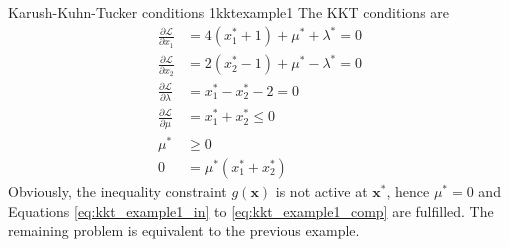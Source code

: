 \begin{example}{Karush-Kuhn-Tucker conditions 1}{kktexample1}
    The KKT conditions are 
    \begin{align}
        \frac{\partial \mathcal{L}}{\partial x_1} &= 4 (x_1^* + 1) + \mu^* + \lambda^*  = 0\\
        \frac{\partial \mathcal{L}}{\partial x_2} &= 2 (x_2^* - 1) + \mu^* - \lambda^*  = 0\\
        \frac{\partial \mathcal{L}}{\partial \lambda} &= x_1^* - x_2^* - 2 = 0 \\
        \label{eq:kkt_example1_in}
        \frac{\partial \mathcal{L}}{\partial \mu} &= x_1^*+x_2^* \le 0 \\
        \mu^* &\ge 0 \\
        0 &= \mu^*(x_1^*+x_2^*)
        \label{eq:kkt_example1_comp}
    \end{align}
    Obviously, the inequality constraint $g(\mathbf{x})$ is not active at $\mathbf{x}^*$, hence $\mu^*=0$ and Equations \eqref{eq:kkt_example1_in} to \eqref{eq:kkt_example1_comp} are fulfilled. The remaining problem is equivalent to the previous example.
\end{example}

